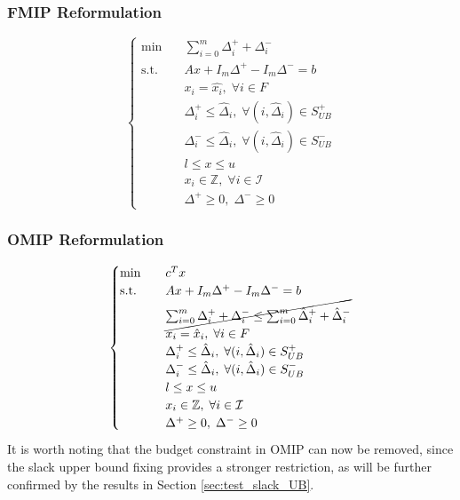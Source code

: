 \subsubsection{FMIP Reformulation}
\begin{equation}
\begin{cases}
\text{min} \quad & \sum_{i=0}^m \Delta_i^{+}+\Delta_i^{-} \\ 
\text{s.t.} \quad & Ax + I_m\Delta^+ - I_m\Delta^- = b\\ 
& x_i = \hat{x_i}, \; \forall i \in F\\ 
& \Delta^+_i \le \hat{\Delta}_i, \; \forall (i,\hat{\Delta}_i) \in S_{UB}^+\\
& \Delta^-_i \le \hat{\Delta}_i, \; \forall (i,\hat{\Delta}_i) \in S_{UB}^-\\  
& l \le x \le u\\ 
& x_i \in \mathbb{Z}, \; \forall i \in \mathcal{I} \\ 
& \Delta^+ \ge 0, \; \Delta^- \ge 0
\end{cases}
\end{equation}

\subsubsection{OMIP Reformulation}
\begin{equation}
\begin{cases}
\text{min} \quad & c^T x \\ 
\text{s.t.} \quad & Ax + I_m\Delta^+ - I_m\Delta^- = b\\
& \cancel{\sum_{i=0}^m \Delta_i^{+}+\Delta_i^{-} \le \sum_{i=0}^m \hat\Delta_i^{+}+\hat\Delta_i^{-}}\\ 
& x_i = \hat{x}_i, \; \forall i \in F\\ 
& \Delta^+_i \le \hat{\Delta}_i, \; \forall (i,\hat{\Delta}_i) \in S_{UB}^+\\
& \Delta^-_i \le \hat{\Delta}_i, \; \forall (i,\hat{\Delta}_i) \in S_{UB}^-\\   
& l \le x \le u\\ 
& x_i \in \mathbb{Z}, \; \forall i \in \mathcal{I} \\ 
& \Delta^+ \ge 0, \; \Delta^- \ge 0 
\end{cases}
\end{equation}
It is worth noting that the budget constraint in OMIP can now be removed, since the slack upper bound fixing provides a stronger restriction, as will be further confirmed by the results in Section \ref{sec:test_slack_UB}.  

